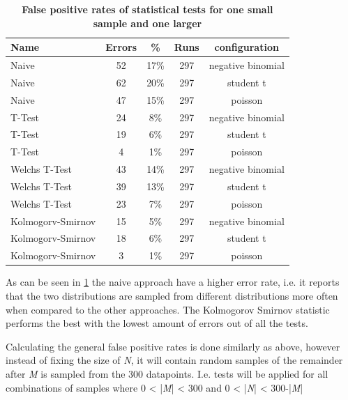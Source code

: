 \begin{table}[htp]
    \centering
    \begin{tabular}{lcccc} %
        {\bf Name} & {\bf Errors} & {\bf \%} & {\bf Runs} & {\bf configuration}\\
        \hline %
        Naive               & 52 & 17\% & 297 & negative binomial\\
        Naive               & 62 & 20\% & 297 & student t\\
        Naive               & 47 & 15\% & 297 & poisson\\
        \hline
        T-Test              & 24 & 8\%  & 297 & negative binomial\\
        T-Test              & 19 & 6\%  & 297 & student t\\
        T-Test              &  4 & 1\%  & 297 & poisson\\
        \hline
        Welchs T-Test       & 43 & 14\%  & 297 & negative binomial\\
        Welchs T-Test       & 39 & 13\%  & 297 & student t\\
        Welchs T-Test       &  23 & 7\%  & 297 & poisson\\
        \hline
        Kolmogorv-Smirnov   & 15 & 5\%  & 297 & negative binomial\\
        Kolmogorv-Smirnov   & 18 & 6\%  & 297 & student t\\
        Kolmogorv-Smirnov   & 3 & 1\%  & 297 & poisson\\
        \hline
        
    
    \end{tabular}
    \caption{\textbf{False positive rates of statistical tests for one small sample and one larger}}
    \label{fig:false_positives}
\end{table}

As can be seen in \ref{fig:false_positives} the naive approach have a higher error rate, i.e. it reports that the two distributions are sampled from different distributions more often when compared to the other approaches. The Kolmogorov Smirnov statistic performs the best with the lowest amount of errors out of all the tests. 

Calculating the general false positive rates is done similarly as above, however instead of fixing the size of \emph{N}, it will contain random samples of the remainder after \emph{M} is sampled from the 300 datapoints. I.e. tests will be applied for all combinations of samples where 0 < |\emph{M}| < 300 and 0 < |\emph{N}| < 300-|\emph{M}|


